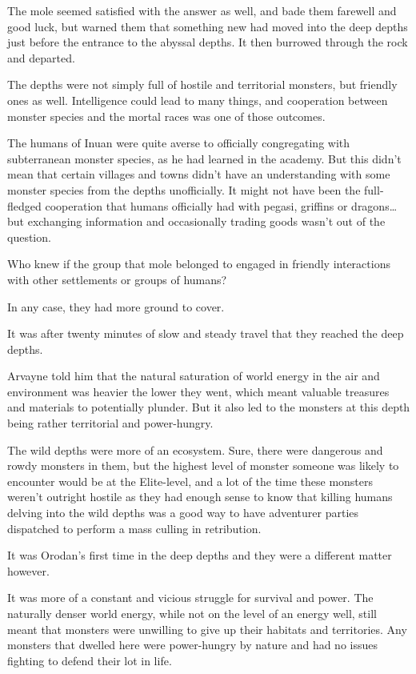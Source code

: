 \documentclass[a4paper,10pt]{book}
\begin{document}
The mole seemed satisfied with the answer as well, and bade them farewell and good luck, but warned them that something new had moved into the deep depths just before the entrance to the abyssal depths. It then burrowed through the rock and departed.\par
The depths were not simply full of hostile and territorial monsters, but friendly ones as well. Intelligence could lead to many things, and cooperation between monster species and the mortal races was one of those outcomes.\par
The humans of Inuan were quite averse to officially congregating with subterranean monster species, as he had learned in the academy. But this didn’t mean that certain villages and towns didn’t have an understanding with some monster species from the depths unofficially. It might not have been the full-fledged cooperation that humans officially had with pegasi, griffins or dragons… but exchanging information and occasionally trading goods wasn’t out of the question.\par
Who knew if the group that mole belonged to engaged in friendly interactions with other settlements or groups of humans?\par
In any case, they had more ground to cover.\par
\par
It was after twenty minutes of slow and steady travel that they reached the deep depths.\par
Arvayne told him that the natural saturation of world energy in the air and environment was heavier the lower they went, which meant valuable treasures and materials to potentially plunder. But it also led to the monsters at this depth being rather territorial and power-hungry.\par
The wild depths were more of an ecosystem. Sure, there were dangerous and rowdy monsters in them, but the highest level of monster someone was likely to encounter would be at the Elite-level, and a lot of the time these monsters weren’t outright hostile as they had enough sense to know that killing humans delving into the wild depths was a good way to have adventurer parties dispatched to perform a mass culling in retribution.\par
It was Orodan’s first time in the deep depths and they were a different matter however.\par
It was more of a constant and vicious struggle for survival and power. The naturally denser world energy, while not on the level of an energy well, still meant that monsters were unwilling to give up their habitats and territories. Any monsters that dwelled here were power-hungry by nature and had no issues fighting to defend their lot in life.\par
\end{document}
